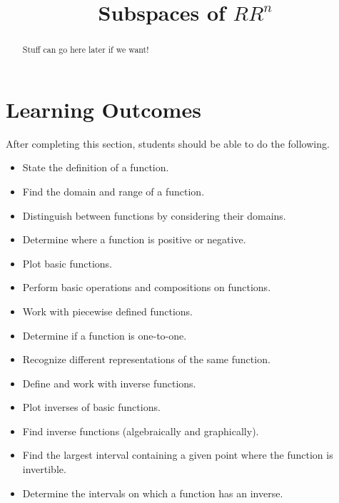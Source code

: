 \documentclass{ximera}
\title{Subspaces of $RR^n$}
\begin{document}
\begin{abstract}
Stuff can go here later if we want!
\end{abstract}
 
\maketitle
 
\section*{Learning Outcomes}
After completing this section, students should be able to do the following.
 
\begin{itemize}
    \item State the definition of a function.
    \item Find the domain and range of a function.
    \item Distinguish between functions by considering their domains.
    \item Determine where a function is positive or negative.
    \item Plot basic functions.
        \item Perform basic operations and compositions on
          functions.
        \item Work with piecewise defined functions.
    \item Determine if a function is one-to-one.
    \item Recognize different representations of the same function.
        \item Define and work with inverse functions.
        \item Plot inverses of basic functions.
    \item Find inverse functions (algebraically and graphically).
        \item Find the largest interval containing a given point
          where the function is invertible.
    \item Determine the intervals on which a function has an inverse.
 
\end{itemize}

 
\end{document}
